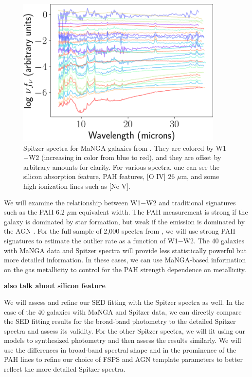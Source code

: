 \documentclass[12pt, preprint]{hacked-aastex}
\begin{document}
\begin{figure}[t!]
\includegraphics[width=0.92\textwidth]{all-spitzer.png}
    \caption{
\label{fig:spitzer} \small Spitzer spectra for MaNGA galaxies
from \cite{lambrides}. They are colored by W1$-$W2 (increasing
in color from blue to red), and they are offset by arbitrary
amounts for clarity. For various spectra, one can see 
the silicon absorption  feature, PAH features, [O IV] 26 $\mu$m, 
and some high ionization lines such as [Ne V].
}
\end{figure}

We will examine the relationship between W1$-$W2 and traditional
signatures such as the PAH 6.2 $\mu$m equivalent width. The PAH
measurement is strong if the galaxy is dominated by star formation,
but weak if the emission is dominated by the AGN \cite{sajina22a}.
For the full sample of 2,000 spectra from \cite{lambrides}, we will
use strong PAH signatures to estimate the outlier rate as a function
of W1$-$W2.  The 40 galaxies with MaNGA data and Spitzer spectra will
provide less statistically powerful but more detailed information. In
these cases, we can use MaNGA-based information on the gas metallicity
to control for the PAH strength dependence on metallicity.

{\bf also talk about silicon feature}

We will assess and refine our SED fitting with the Spitzer spectra as
well.  In the case of the 40 galaxies with MaNGA and Spitzer data, we
can directly compare the SED fitting results for the broad-band
photometry to the detailed Spitzer spectra and assess its
validity. For the other Spitzer spectra, we will fit using our models
to synthesized photometry and then assess the results similarly. We
will use the differences in broad-band spectral shape and in the
prominence of the PAH lines to refine our choice of FSPS and AGN
template parameters to better reflect the more detailed Spitzer
spectra.
\end{document}
